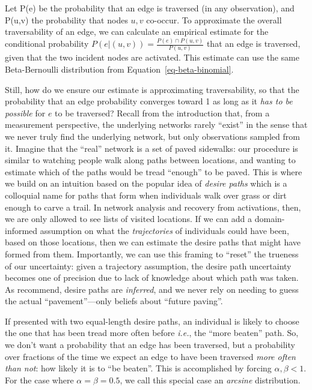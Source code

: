 \documentclass[%
	12pt,
		oneside,
		letterpaper
]{book}
\begin{document}
Let P(e) be the probability that an edge is traversed (in any
observation), and P(u,v) the probability that nodes \(u,v\) co-occur. To
approximate the overall traversability of an edge, we can calculate an
empirical estimate for the conditional probability
\(P(e|(u,v))=\frac{P(e)\cap P(u,v)}{P(u,v)}\) that an edge is traversed,
given that the two incident nodes are activated. This estimate can use
the same Beta-Bernoulli distribution from
Equation~\ref{eq-beta-binomial}.

Still, how do we ensure our estimate is approximating traversability, so
that the probability that an edge probability converges toward 1 as long
as it \emph{has to be possible} for \(e\) to be traversed? Recall from
the introduction that, from a measurement perspective, the underlying
networks rarely ``exist'' in the sense that we never truly find the
underlying network, but only observations sampled from it. Imagine that
the ``real'' network is a set of paved sidewalks: our procedure is
similar to watching people walk along paths between locations, and
wanting to estimate which of the paths would be tread ``enough'' to be
paved. This is where we build on an intuition based on the popular idea
of \emph{desire paths} which is a colloquial name for paths that form
when individuals walk over grass or dirt enough to carve a trail. In
network analysis and recovery from activations, then, we are only
allowed to see lists of visited locations. If we can add a
domain-informed assumption on what the \emph{trajectories} of
individuals could have been, based on those locations, then we can
estimate the desire paths that might have formed from them. Importantly,
we can use this framing to ``reset'' the trueness of our uncertainty:
given a trajectory assumption, the desire path uncertainty becomes one
of precision due to lack of knowledge about which path was taken. As
\textcite{Statisticalinferencelinks_Peel2022} recommend, desire paths
are \emph{inferred}, and we never rely on needing to guess the actual
``pavement''---only beliefs about ``future paving''.

If presented with two equal-length desire paths, an individual is likely
to choose the one that has been tread more often before \emph{i.e.}, the
``more beaten'' path. So, we don't want a probability that an edge has
been traversed, but a probability over fractions of the time we expect
an edge to have been traversed \emph{more often than not}: how likely it
is to ``be beaten''. This is accomplished by forcing
\(\alpha, \beta < 1\). For the case where \(\alpha=\beta=0.5\), we call
this special case an \emph{arcsine} distribution.
\end{document}
